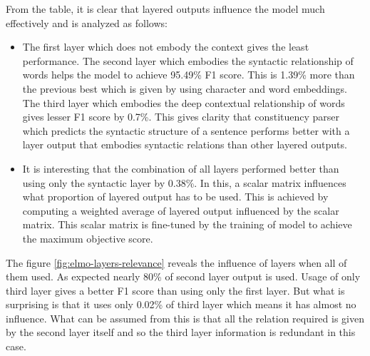 \documentclass[a4paper, 11pt]{article}
\begin{document}
From the table, it is clear that layered outputs influence the model much effectively and is analyzed as follows:
\begin{itemize}
\item The first layer which does not embody the context gives the least performance. The second layer which embodies the syntactic relationship of words helps the model to achieve 95.49\% F1 score. This is 1.39\% more than the previous best which is given by using character and word embeddings. The third layer which embodies the deep contextual relationship of words gives lesser F1 score by 0.7\%. This gives clarity that constituency parser which predicts the syntactic structure of a sentence performs better with a layer output that embodies syntactic relations than other layered outputs. 
\item It is interesting that the combination of all layers performed better than using only the syntactic layer by 0.38\%. In this, a scalar matrix influences what proportion of layered output has to be used. This is achieved by computing a weighted average of layered output influenced by the scalar matrix. This scalar matrix is fine-tuned by the training of model to achieve the maximum objective score. 
\end{itemize}

The figure \ref{fig:elmo-layers-relevance} reveals the influence of layers when all of them used. As expected nearly 80\% of second layer output is used. Usage of only third layer gives a better F1 score than using only the first layer. But what is surprising is that it uses only 0.02\% of third layer which means it has almost no influence. What can be assumed from this is that all the relation required is given by the second layer itself and so the third layer information is redundant in this case. 
\end{document}
